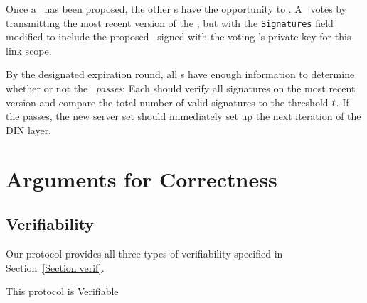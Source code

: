 Once a \KwPetition~has been proposed, the other \KwMember s have the
opportunity to \NameVote. A \KwMember~votes by transmitting the most
recent version of the \SetVotes, but with the \texttt{Signatures} field
modified to include the proposed \KwManifest~signed with the voting
\KwMember's private key for this link scope.

By the designated expiration round, all \KwMember s have enough
information to determine whether or not the \KwPetition~\emph{passes}:
Each \KwMember should verify all signatures on the most recent
version
and compare the total number of valid signatures to the threshold $t$. If the
\KwPetition passes, the new server set should immediately set up the
next iteration of the DIN layer.

\section{Arguments for Correctness}
\subsection{Verifiability}
Our protocol provides all three types of verifiability specified in
Section~\ref{Section:verif}.

\begin{theorem} This protocol is Verifiable\end{theorem}

